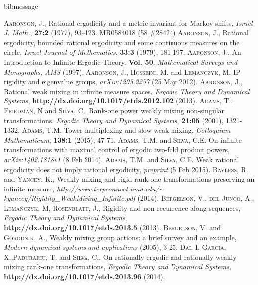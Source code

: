 \documentclass[12pt]{amsart}
\begin{document}
\begin{thebibliography}{9}
\csname bibmessage\endcsname

\textsc{Aaronson, J.}, Rational ergodicity and a metric invariant for {M}arkov shifts, 
\textit{Israel J. Math.}, \textbf{27:2} (1977), 93--123. {\href{http://www.ams.org/mathscinet-getitem?mr={0584018 (58
  \#28424)}}{MR{0584018 (58
  \#28424)}}}
 \textsc{Aaronson, J.}, Rational ergodicity, bounded rational ergodicity and some continuous measures on the circle, \textit{Israel Journal of Mathematics}, \textbf{33:3} (1979), 181-197.
 \textsc{Aaronson, J.}, An Introduction to Infinite Ergodic Theory. \textbf{Vol. 50}. \textit{Mathematical Surveys and Monographs, AMS} (1997). 
 \textsc{Aaronson, J.}, \textsc{Hosseini, M.} and \textsc{Lemanczyk, M}, IP-rigidity and eigenvalue groups, \textit{arXiv:1203.2257} (25 May 2012).
 \textsc{Aaronson, J.}, Rational weak mixing in infinite measure spaces, \textit{Ergodic Theory and Dynamical Systems}, \textbf{http://dx.doi.org/10.1017/etds.2012.102} (2013). 
 \textsc{Adams, T.}, \textsc{Friedman, N} and \textsc{Silva, C.}, Rank-one power weakly mixing non-singular transformations, \textit{Ergodic Theory and Dynamical Systems}, \textbf{21:05} (2001), 1321-1332.
 \textsc{Adams, T.M.} Tower multiplexing and slow weak mixing, \textit{Colloquium Mathematicum}, \textbf{138:1} (2015), 47-71.
 \textsc{Adams, T.M.} and \textsc{Silva, C.E.} On infinite transformations with maximal control of ergodic two-fold product powers, \textit{arXiv:1402.1818v1} (8 Feb 2014). 
 \textsc{Adams, T.M.} and \textsc{Silva, C.E.} Weak rational ergodicity does not imply rational ergodicity, \textit{preprint} (5 Feb 2015). 
 \textsc{Bayless, R.} and \textsc{Yancey, K.}, Weakly mixing and rigid rank-one transformations preserving an infinite measure, \textit{http://www.terpconnect.umd.edu/$\sim$kyancey/Rigidity\_WeakMixing\_Infinite.pdf} (2014). 
 \textsc{Bergelson, V.}, \textsc{del Junco, A.}, \textsc{Lema\'nczyk, M}, \textsc{Rosenblatt, J.}, Rigidity and non-recurrence along sequences, \textit{Ergodic Theory and Dynamical Systems}, \textbf{http://dx.doi.org/10.1017/etds.2013.5} (2013).
 \textsc{Bergelson, V.} and \textsc{Gorodnik, A.}, Weakly mixing group actions: a brief survey and an example, \textit{Modern dynamical systems and applications} (2005), 3-25.
 \textsc{Dai, I}, \textsc{Garcia, X.},\textsc{Padurariu, T.} and \textsc{Silva, C.}, On rationally ergodic and rationally weakly mixing rank-one transformations, \textit{Ergodic Theory and Dynamical Systems}, \textbf{http://dx.doi.org/10.1017/etds.2013.96} (2014). 

\end{thebibliography}
\end{document}
